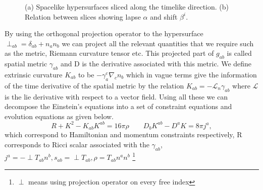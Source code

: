 \documentclass[11pt]{article}
\begin{document}
\begin{figure}
\begin{minipage}{0.38\textwidth}

\end{minipage}

\caption{
(a) Spacelike hypersurfaces sliced along the timelike direction. 
(b) Relation between slices showing lapse $\alpha$ and shift $\beta^i$.
}
\end{figure}

By using the orthogonal projection operator to the hypersurface $\perp_{ab} = \delta_{ab} +n_a n_b$ we can project all  the relevant quantities that we require such as the metric, Riemann curvature tensor etc. This projected part of $g_{ab}$ is called spatial metric $\gamma_{ab}$ and D is the derivative associated with this metric. We define extrinsic curvature $K_{ab}$ to be $-\gamma^c_a \nabla_c n_b$ which in vague terms give the information of the time derivative of the spatial metric by the relation $K_{ab} = -\mathcal{L}_n \gamma_{ab}$ where $\mathcal{L}$ is the lie derivative with respect to a vector field. Using all these we can decompose the Einstein's equations into a set of constraint equations and evolution equations as given below.
\begin{equation}
\label{eq:Constraints}
R + K^2 - K_{ab} K^{ab} = 16\pi \rho 
\qquad
D_b K^{ab} - D^a K = 8\pi j^a,
\end{equation}
which correspond to Hamiltonian and momentum constraints respectively, R corresponds to Ricci scalar associated with the $\gamma_{ab}$, $j^a =- \perp T_{ab}n^b, s_{ab}= \perp T_{ab}, \mathcal{\rho} =T_{ab}n^a n^b $ \footnote{$\perp$ means using projection operator on every free index}
\end{document}
